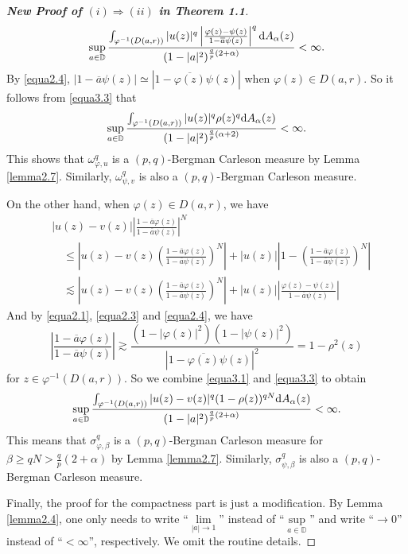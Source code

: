 \documentclass[preprint,12pt,times]{elsarticle}
\theoremstyle{definition}
\theoremstyle{remark}
\numberwithin{equation}{section}
\begin{document}
\begin{proof}[{\bf New Proof of $(i)\Rightarrow(ii)$ in Theorem 1.1}]
\begin{equation}\label{equa3.3}
\sup_{a\in\mathbb{D}}\frac{\int_{\varphi^{-1}(D(a,r))}|u(z)|^q\left|\frac{\varphi(z)-\psi(z)}{1-\overline{a}\psi(z)}\right|^q{\rm d}A_{\alpha}(z)}{(1-|a|^2)^{\frac{q}{p}(2+\alpha)}}<\infty.
\end{equation}
By \eqref{equa2.4}, $|1-\overline{a}\psi(z)|\simeq |1-\overline{\varphi(z)}\psi(z)|$ when $\varphi(z)\in D(a,r)$. So it follows from \eqref{equa3.3} that
\begin{align*}
\sup_{a\in\mathbb{D}}\frac{\int_{\varphi^{-1}(D(a,r))}|u(z)|^q\rho(z)^q{\rm d}A_{\alpha}(z)}{(1-|a|^2)^{\frac{q}{p}(\alpha+2)}}<\infty.
\end{align*}
This shows that $\omega_{\varphi,u}^q$ is a $(p,q)$-Bergman Carleson measure by Lemma \ref{lemma2.7}. Similarly, $\omega_{\psi,v}^q$ is also a $(p,q)$-Bergman Carleson measure.

On the other hand, when $\varphi(z)\in D(a,r)$, we have
\begin{equation}\label{equa3.4}
\begin{split}
&|u(z)-v(z)|\left|\frac{1-\overline{a}\varphi(z)}{1-\overline{a}\psi(z)}\right|^N\\
&\quad \leq \left|u(z)-v(z)\left(\frac{1-\overline{a}\varphi(z)}{1-\overline{a}\psi(z)}\right)^N\right|+|u(z)|\left|1-\left(\frac{1-\overline{a}\varphi(z)}{1-\overline{a}\psi(z)}\right)^N\right|\\
&\quad \lesssim \left|u(z)-v(z)\left(\frac{1-\overline{a}\varphi(z)}{1-\overline{a}\psi(z)}\right)^N\right|+|u(z)|\left|\frac{\varphi(z)-\psi(z)}{1-\overline{a}\psi(z)}\right|
\end{split}
\end{equation}
And by \eqref{equa2.1}, \eqref{equa2.3} and \eqref{equa2.4}, we have
\begin{equation}\label{equa3.5}
\left|\frac{1-\overline{a}\varphi(z)}{1-\overline{a}\psi(z)}\right|\gtrsim \frac{(1-|\varphi(z)|^2)(1-|\psi(z)|^2)}{|1-\overline{\varphi(z)}\psi(z)|^2}=1-\rho^2(z)
\end{equation}
for $z\in \varphi^{-1}(D(a,r))$. So we combine \eqref{equa3.1} and \eqref{equa3.3} to obtain
\begin{equation*}
\sup_{a\in\mathbb{D}}\frac{\int_{\varphi^{-1}(D(a,r))}|u(z)-v(z)|^q(1-\rho(z))^{qN}{\rm d}A_{\alpha}(z)}{(1-|a|^2)^{\frac{q}{p}(2+\alpha)}}<\infty.
\end{equation*}
This means that $\sigma_{\varphi,\beta}^q$ is a $(p,q)$-Bergman Carleson measure for $\beta\geq qN>\frac{q}{p}(2+\alpha)$ by Lemma \ref{lemma2.7}. Similarly, $\sigma_{\psi,\beta}^q$ is also a $(p,q)$-Bergman Carleson measure.

Finally, the proof for the compactness part is just a modification. By Lemma \ref{lemma2.4}, one only needs to write ``$\lim\limits_{|a|\to 1}$'' instead of ``$\sup\limits_{a\in\mathbb{D}}$'' and write ``$\to 0$'' instead of ``$<\infty$'', respectively. We omit the routine details.
\end{proof}
\end{document}
